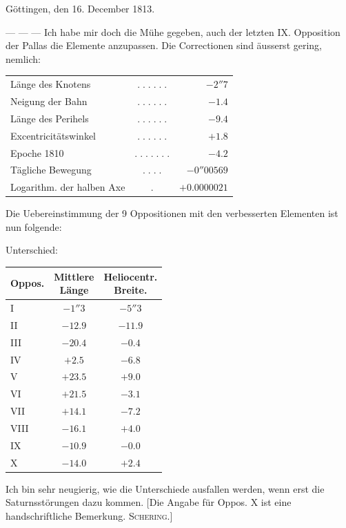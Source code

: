 \begin{flushright}\leavevmode{}Göttingen, den 16. December 1813.\end{flushright}
\noindent --- --- --- Ich habe mir doch die Mühe gegeben, auch der letzten IX. Opposition der Pallas die
Elemente anzupassen. Die Correctionen sind äusserst gering, nemlich:
\begin{center}\fontsize{10}{12}\selectfont\setlength{\tabcolsep}{2pt}\renewcommand{\arraystretch}{1.15}\begin{tabular}{lcr}
Länge des Knotens & $.\;.\;.\;.\;.\;.$ & $-2''7$\\
Neigung der Bahn & $.\;.\;.\;.\;.\;.$ & $-1.4$\\
Länge des Perihels & $.\;.\;.\;.\;.\;.$ & $-9.4$\\
Excentricitätswinkel & $.\;.\;.\;.\;.\;.$ & $+1.8$\\
Epoche 1810 & $.\;.\;.\;.\;.\;.\;.$ & $-4.2$\\
Tägliche Bewegung & $.\;.\;.\;.$ & $-0''00569$\\
Logarithm. der halben Axe & $.$ & $+0.0000021$\\
\end{tabular}\end{center}
\par\indent Die Uebereinstimmung der 9 Oppositionen mit den verbesserten Elementen ist nun folgende:
\begin{center}Unterschied:\end{center}
\begin{center}\fontsize{10}{12}\selectfont\setlength{\tabcolsep}{7pt}\renewcommand{\arraystretch}{1.15}\begin{tabular}{l|c|c}
Oppos. & \shortstack{Mittlere\\Länge} & \shortstack{Heliocentr.\\Breite.}\\\hline
I & $-1''3$ & $-5''3$\\
II & $-12.9$ & $-11.9$\\
III & $-20.4$ & $-0.4$\\
IV & $+2.5$ & $-6.8$\\
V & $+23.5$ & $+9.0$\\
VI & $+21.5$ & $-3.1$\\
VII & $+14.1$ & $-7.2$\\
VIII & $-16.1$ & $+4.0$\\
IX & $-10.9$ & $-0.0$\\
X & $-14.0$ & $+2.4$\\
\end{tabular}\end{center}
\par\indent Ich bin sehr neugierig, wie die Unterschiede ausfallen werden, wenn erst die
Saturnsstörungen dazu kommen. [Die Angabe für Oppos. X ist eine handschriftliche Bemerkung.
\textsc{Schering}.]
